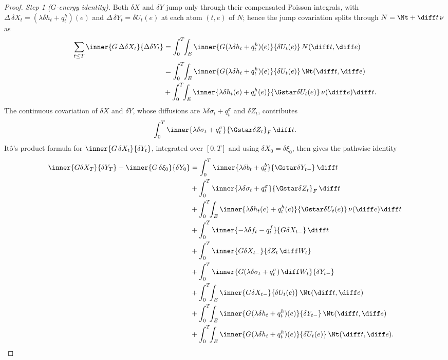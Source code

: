 \begin{proof}
\emph{Step 1 ($G$-energy identity).} Both $\delta X$ and $\delta Y$ jump only through
their compensated Poisson integrals, with $\Delta\,\delta X_t=(\lambda\delta h_t+q^h_t)(e)$
and $\Delta\,\delta Y_t=\delta U_t(e)$ at each atom $(t,e)$ of $N$; hence the jump
covariation splits through $N=\Nt+\diff t\,\nu$ as
\[
\begin{aligned}
\sum_{t\le T}\inner{G\,\Delta\delta X_t}{\Delta\delta Y_t}
&=\int_0^T\!\!\int_E\inner{G(\lambda\delta h_t+q^h_t)(e)}{\delta U_t(e)}\,N(\diff t,\diff e)\\
&=\int_0^T\!\!\int_E\inner{G(\lambda\delta h_t+q^h_t)(e)}{\delta U_t(e)}\,\Nt(\diff t,\diff e)\\
&+\int_0^T\!\!\int_E\inner{\lambda\delta h_t(e)+q^h_t(e)}{\Gstar\delta U_t(e)}\,\nu(\diff e)\diff t .
\end{aligned}
\]
The continuous covariation of $\delta X$ and $\delta Y$, whose diffusions are
$\lambda\delta\sigma_t+q^\sigma_t$ and $\delta Z_t$, contributes
\[
\int_0^T\inner{\lambda\delta\sigma_t+q^\sigma_t}{\Gstar\delta Z_t}_F\,\diff t .
\]
It\^o's product formula for $\inner{G\,\delta X_t}{\delta Y_t}$, integrated over $[0,T]$ and using
$\delta X_0=\delta\xi_0$, then gives the pathwise identity
\begin{equation}\label{eq:Gid-path}
\begin{aligned}
\inner{G\delta X_T}{\delta Y_T}-\inner{G\,\delta\xi_0}{\delta Y_0}
&=\int_0^T\inner{\lambda\delta b_t+q^b_t}{\Gstar\delta Y_{t-}}\,\diff t\\
&+\int_0^T\inner{\lambda\delta\sigma_t+q^\sigma_t}{\Gstar\delta Z_t}_F\,\diff t\\
&+\int_0^T\!\!\int_E\inner{\lambda\delta h_t(e)+q^h_t(e)}{\Gstar\delta U_t(e)}\,\nu(\diff e)\diff t\\
&+\int_0^T\inner{-\lambda\delta f_t-q^f_t}{G\delta X_{t-}}\,\diff t\\
&+\int_0^T\inner{G\delta X_{t-}}{\delta Z_t\,\diff W_t}\\
&+\int_0^T\inner{G(\lambda\delta\sigma_t+q^\sigma_t)\,\diff W_t}{\delta Y_{t-}}\\
&+\int_0^T\!\!\int_E\inner{G\delta X_{t-}}{\delta U_t(e)}\,\Nt(\diff t,\diff e)\\
&+\int_0^T\!\!\int_E\inner{G(\lambda\delta h_t+q^h_t)(e)}{\delta Y_{t-}}\,\Nt(\diff t,\diff e)\\
&+\int_0^T\!\!\int_E\inner{G(\lambda\delta h_t+q^h_t)(e)}{\delta U_t(e)}\,\Nt(\diff t,\diff e) .
\end{aligned}
\end{equation}

\end{proof}
